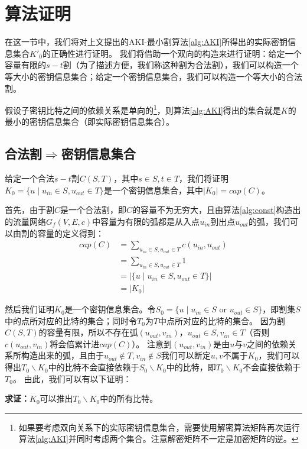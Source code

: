 \section{算法证明}
在这一节中，我们将对上文提出的AKI-最小割算法\ref{alg:AKI}所得出的实际密钥信息集合$K'_0$的正确性进行证明。
我们将借助一个双向的构造来进行证明：给定一个容量有限的$s-t$割（为了描述方便，我们称这种割为合法割），我们可以构造一个等大小的密钥信息集合；给定一个密钥信息集合，我们可以构造一个等大小的合法割。
\begin{thm}
    假设子密钥比特之间的依赖关系是单向的\footnote{如果要考虑双向关系下的实际密钥信息集合，需要使用解密算法矩阵再次运行算法\ref{alg:AKI}并同时考虑两个集合。注意解密矩阵不一定是加密矩阵的逆。}，则算法\ref{alg:AKI}得出的集合就是$K$的最小的密钥信息集合（即实际密钥信息集合）。
\end{thm}
\subsection{合法割$\Rightarrow$密钥信息集合}
给定一个合法$s-t$割$C(S,T)$，其中$s\in S,t\in T$，我们将证明$K_0=\{u\mid u_{in}\in S,u_{out}\in T\}$是一个密钥信息集合，其中$|K_0|=cap(C)$。

首先，由于割$C$是一个合法割，即$C$的容量不为无穷大，且由算法\ref{alg:const}构造出的流量网络$G_f(V,E,c)$中容量为有限的弧都是从入点$u_{in}$到出点$u_{out}$的弧，我们可以由割的容量的定义得到：
$$\begin{aligned}
    cap(C)&=\sum_{u_{in}\in S,u_{out}\in T}c(u_{in},u_{out})\\
          &=\sum_{u_{in}\in S,u_{out}\in T}1\\
          &=|\{u\mid u_{in}\in S,u_{out}\in T\}|\\
          &=|K_0|
\end{aligned}$$

然后我们证明$K_0$是一个密钥信息集合。令$S_0=\{u\mid u_{in}\in S\mbox{ or }u_{out}\in S\}$，即割集$S$中的点所对应的比特的集合；同时令$T_0$为$T$中点所对应的比特的集合。
因为割$C(S,T)$的容量有限，所以不存在弧$(u_{out},v_{in})$，$u_{out}\in S,v_{in}\in T$（否则$c(u_{out},v_{in})$将会倍累计进$cap(C)$）。
注意到$(u_{out},v_{in})$是由$u$与$v$之间的依赖关系所构造出来的弧，且由于$u_{out}\notin T,v_{in}\notin S$我们可以断定$u,v$不属于$K_0$，我们可以得出$T_0\backslash K_0$中的比特不会直接依赖于$S_0\backslash K_0$中的比特，即$T_0\backslash K_0$不会直接依赖于$T_0$。
由此，我们可以有以下证明：

\noindent
\textbf{求证：}$K_0$可以推出$T_0\backslash K_0$中的所有比特。

